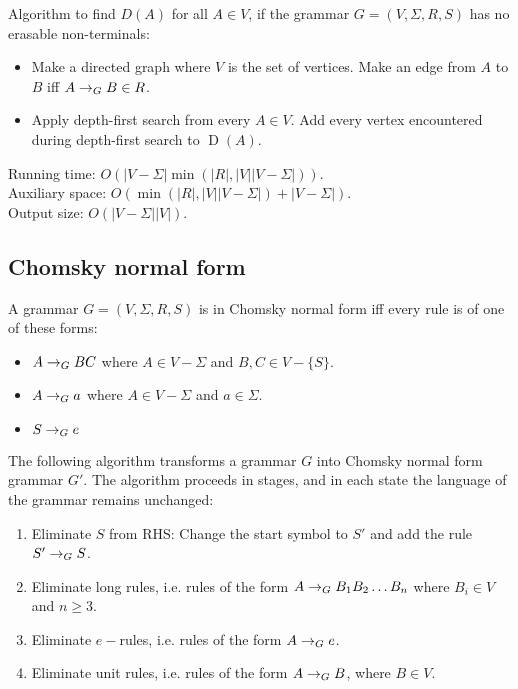 Algorithm to find $D(A)$ for all $A \in V$,
if the grammar $G = (V, \Sigma, R, S)$ has no erasable non-terminals:
\begin{itemize}
\item Make a directed graph where $V$ is the set of vertices.
    Make an edge from $A$ to $B$ iff $A \rightarrow_{G} B \in R$.
\item Apply depth-first search from every $A \in V$.
    Add every vertex encountered during depth-first search to $\operatorname{D}(A)$.
\end{itemize}

Running time: $O(|V-\Sigma|\min(|R|, |V||V-\Sigma|))$.\\
Auxiliary space: $O(\min(|R|, |V||V-\Sigma|) + |V-\Sigma|)$.\\
Output size: $O(|V-\Sigma||V|)$.

\subsection{Chomsky normal form}

\begin{definition}
A grammar $G = (V, \Sigma, R, S)$ is in Chomsky normal form iff every rule is of one of these forms:
\begin{itemize}
\item $A \rightarrow_{G} BC$ where $A \in V - \Sigma$ and $B, C \in V - \{S\}$.
\item $A \rightarrow_{G} a$ where $A \in V - \Sigma$ and $a \in \Sigma$.
\item $S \rightarrow_{G} e$
\end{itemize}
\end{definition}

The following algorithm transforms a grammar $G$ into Chomsky normal form grammar $G'$.
The algorithm proceeds in stages, and in each state the language of the grammar remains unchanged:
\begin{enumerate}
\item Eliminate $S$ from RHS: Change the start symbol to $S'$ and add the rule $S' \rightarrow_{G} S$.
\item Eliminate long rules, i.e. rules of the form $A \rightarrow_{G} B_1B_2\ldots B_n$ where $B_i \in V$ and $n \ge 3$.
\item Eliminate $e-$rules, i.e. rules of the form $A \rightarrow_{G} e$.
\item Eliminate unit rules, i.e. rules of the form $A \rightarrow_{G} B$, where $B \in V$.
\end{enumerate}

